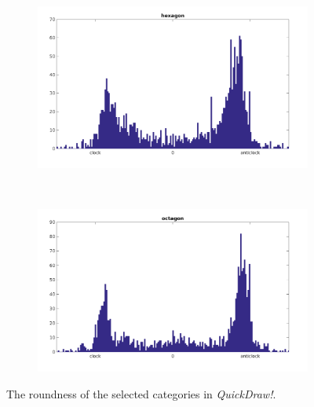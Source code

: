 \begin{figure}
\begin{subfigure}{0.4\textwidth}
    \end{subfigure}
    ~
    \begin{subfigure}{0.4\textwidth}
        \includegraphics[scale=0.2]{images/dataset/quickdraw_hex_rond.png}
    \end{subfigure}
    ~
    \begin{subfigure}{0.4\textwidth}
        \includegraphics[scale=0.2]{images/dataset/quickdraw_oct_rond.png}
    \end{subfigure}

    \caption{The roundness of the selected categories in \textit{QuickDraw!}.}

    \label{fig:quickdraw_rond}
\end{figure}

